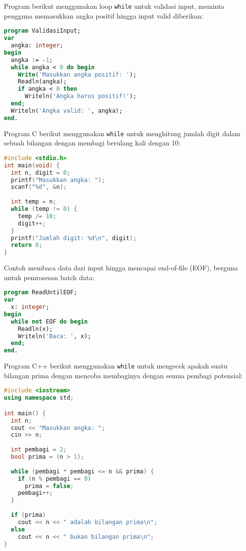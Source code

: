 \documentclass[../main.tex]{subfiles}
\begin{document}
Program berikut menggunakan loop \texttt{while} untuk validasi input, meminta pengguna memasukkan angka positif hingga input valid diberikan:

\begin{lstlisting}[language=Pascal, caption={Input validasi dengan while (Pascal)}]
program ValidasiInput;
var
  angka: integer;
begin
  angka := -1;
  while angka < 0 do begin
    Write('Masukkan angka positif: ');
    Readln(angka);
    if angka < 0 then
      Writeln('Angka harus positif!');
  end;
  Writeln('Angka valid: ', angka);
end.
\end{lstlisting}

Program C berikut menggunakan \texttt{while} untuk menghitung jumlah digit dalam sebuah bilangan dengan membagi berulang kali dengan 10:

\begin{lstlisting}[language=C, caption={Hitung digit dengan while (C)}]
#include <stdio.h>
int main(void) {
  int n, digit = 0;
  printf("Masukkan angka: ");
  scanf("%d", &n);
  
  int temp = n;
  while (temp != 0) {
    temp /= 10;
    digit++;
  }
  printf("Jumlah digit: %d\n", digit);
  return 0;
}
\end{lstlisting}

Contoh membaca data dari input hingga mencapai end-of-file (EOF), berguna untuk pemrosesan batch data:

\begin{lstlisting}[language=Pascal, caption={Baca hingga EOF (Pascal)}]
program ReadUntilEOF;
var
  x: integer;
begin
  while not EOF do begin
    Readln(x);
    Writeln('Baca: ', x);
  end;
end.
\end{lstlisting}

Program C++ berikut menggunakan \texttt{while} untuk mengecek apakah suatu bilangan prima dengan mencoba membaginya dengan semua pembagi potensial:

\begin{lstlisting}[language=C++, caption={Hitung bilangan prima dengan while (C++)}]
#include <iostream>
using namespace std;

int main() {
  int n;
  cout << "Masukkan angka: ";
  cin >> n;
  
  int pembagi = 2;
  bool prima = (n > 1);
  
  while (pembagi * pembagi <= n && prima) {
    if (n % pembagi == 0)
      prima = false;
    pembagi++;
  }
  
  if (prima)
    cout << n << " adalah bilangan prima\n";
  else
    cout << n << " bukan bilangan prima\n";
}
\end{lstlisting}
\end{document}
